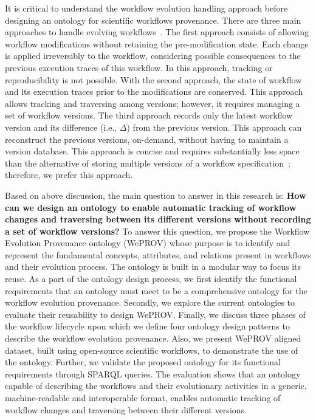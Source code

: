 \documentclass[ao]{iosart2x}
\begin{document}
It is critical to understand the workflow evolution handling approach before designing an ontology for scientific workflows provenance. There are three main approaches to handle evolving workflows~\citep{kradolfer1999dynamic}. 
The first approach consists of allowing workflow modifications without retaining the pre-modification state. Each change is applied irreversibly to the workflow, considering possible consequences to the previous execution traces of this workflow. In this approach, tracking or reproducibility is not possible.
With the second approach, the state of workflow and its execution traces prior to the modifications are conserved. This approach allows tracking and traversing among versions; however, it requires managing a set of workflow versions. 
The third approach records only the latest workflow version and its difference (i.e., $\Delta$) from the previous version. This approach can reconstruct the previous versions, on-demand, without having to maintain a version database. %
This approach is concise and requires substantially less space than the alternative of storing multiple versions of a workflow specification~\citep{roddick1995survey}; therefore, we prefer this approach.

Based on above discussion, the main question to answer in this research is: \textbf{How can we design an ontology to enable automatic tracking of workflow changes and traversing between its different versions without recording a set of workflow versions?} 
To answer this question, we propose the Workflow Evolution Provenance ontology (WePROV) whose purpose is to identify and represent the fundamental concepts, attributes, and relations present in workflows and their evolution process. The ontology is built in a modular way to focus its reuse. As a part of the ontology design process, we first identify the functional requirements that an ontology must meet to be a comprehensive ontology for the workflow evolution provenance. Secondly, we explore the current ontologies to evaluate their reusability to design WePROV.  
Finally, we discuss three phases of the workflow lifecycle upon which we define four ontology design patterns to describe the workflow evolution provenance. Also, we present WePROV aligned dataset, built using open-source scientific workflows, to demonstrate the use of the ontology. 
Further, we validate the proposed ontology for its functional requirements through SPARQL queries. The evaluation shows that an ontology capable of describing the workflows and their evolutionary activities in a generic, machine-readable and interoperable format, enables automatic tracking of workflow changes and traversing between their different versions.
\end{document}
